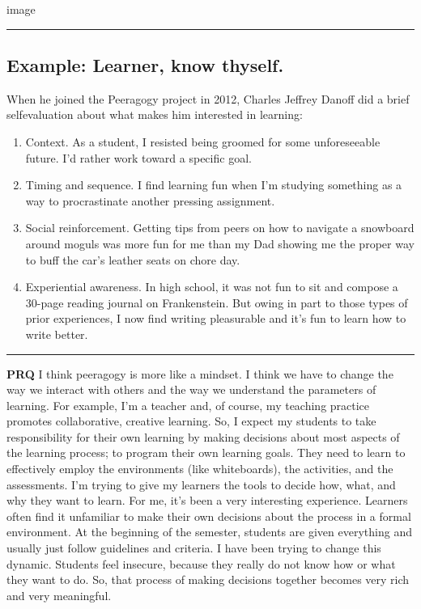 image

\begin{center}\rule{0.5\linewidth}{\linethickness}\end{center}

\subsection{Example: Learner, know
thyself.}\label{example-learner-know-thyself.}

When he joined the Peeragogy project in 2012, Charles Jeffrey Danoff did
a brief self­evaluation about what makes him interested in learning:

\begin{enumerate}
\def\labelenumi{\arabic{enumi}.}
\item
  Context. As a student, I resisted being groomed for some unforeseeable
  future. I'd rather work toward a specific goal.
\item
  Timing and sequence. I find learning fun when I'm studying something
  as a way to procrastinate another pressing assignment.
\item
  Social reinforcement. Getting tips from peers on how to navigate a
  snowboard around moguls was more fun for me than my Dad showing me the
  proper way to buff the car's leather seats on chore day.
\item
  Experiential awareness. In high school, it was not fun to sit and
  compose a 30-page reading journal on Frankenstein. But owing in part
  to those types of prior experiences, I now find writing pleasurable
  and it's fun to learn how to write better.
\end{enumerate}

\begin{center}\rule{0.5\linewidth}{\linethickness}\end{center}

\textbf{PRQ} I think peeragogy is more like a mind­set. I think we have
to change the way we interact with others and the way we understand the
parameters of learning. For example, I'm a teacher and, of course, my
teaching practice promotes collaborative, creative learning. So, I
expect my students to take responsibility for their own learning by
making decisions about most aspects of the learning process; to program
their own learning goals. They need to learn to effectively employ the
environments (like whiteboards), the activities, and the assessments.
I'm trying to give my learners the tools to decide how, what, and why
they want to learn. For me, it's been a very interesting experience.
Learners often find it unfamiliar to make their own decisions about the
process in a formal environment. At the beginning of the semester,
students are given everything and usually just follow guidelines and
criteria. I have been trying to change this dynamic. Students feel
insecure, because they really do not know how or what they want to do.
So, that process of making decisions together becomes very rich and very
meaningful.

